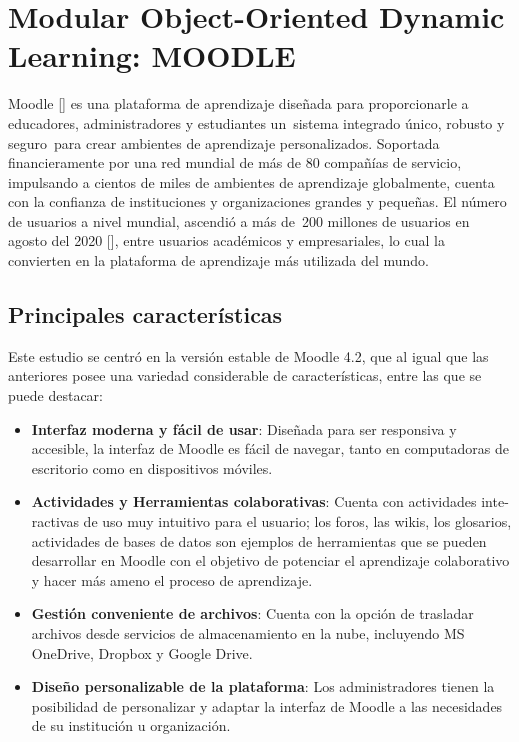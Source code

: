 \section{Modular Object-Oriented Dynamic Learning: MOODLE}
Moodle [\cite{Moodle_Solutions}] es una plataforma de aprendizaje diseñada para proporcionarle a educadores, administradores y estudiantes un sistema integrado único, robusto y seguro para crear ambientes de aprendizaje personalizados. Soportada financieramente por una red mundial de más de 80 compañías de servicio, impulsando a cientos de miles de ambientes de aprendizaje globalmente, cuenta con la confianza de instituciones y organizaciones grandes y pequeñas. El número de usuarios a nivel mundial, ascendió a más de 200 millones de usuarios en agosto del 2020 [\cite{Moodle_stats}], entre usuarios académicos y empresariales, lo cual la convierten en la plataforma de aprendizaje más utilizada del mundo.

\subsection{Principales características}
Este estudio se centró en la versión estable de Moodle 4.2, que al igual que las anteriores posee una variedad considerable de características, entre las que se puede destacar:  
\begin{itemize}
    \item \textbf{Interfaz moderna y fácil de usar}: Diseñada para ser responsiva y accesible, la interfaz de Moodle es fácil de navegar, tanto en computadoras de escritorio como en dispositivos móviles.
    \item \textbf{Actividades y Herramientas colaborativas}: Cuenta con actividades inte-\linebreak ractivas de uso muy intuitivo para el usuario; los foros, las wikis, los glosarios, actividades de bases de datos son ejemplos de herramientas que se pueden desarrollar en Moodle con el objetivo de potenciar el aprendizaje colaborativo y hacer más ameno el proceso de aprendizaje.
    \item \textbf{Gestión conveniente de archivos}: Cuenta con la opción de trasladar archivos desde servicios de almacenamiento en la nube, incluyendo MS OneDrive, Dropbox y Google Drive.
    \item \textbf{Diseño personalizable de la plataforma}: Los administradores tienen la posibilidad de personalizar y adaptar la interfaz de Moodle a las necesidades de su institución u organización. 
\end{itemize}

